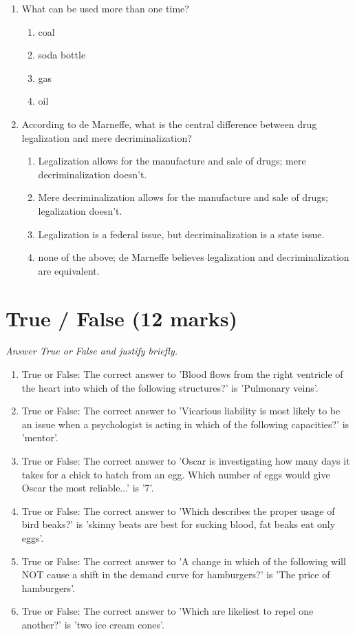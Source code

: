 \documentclass[12pt]{article}
\begin{document}
\begin{enumerate}[label=\arabic*.]
\begin{enumerate}[label=(\alph*)]
    \item painted colors
\end{enumerate}
\item What can be used more than one time?
\begin{enumerate}[label=(\alph*)]
    \item coal
    \item soda bottle
    \item gas
    \item oil
\end{enumerate}
\item According to de Marneffe, what is the central difference between drug legalization and mere decriminalization?
\begin{enumerate}[label=(\alph*)]
    \item Legalization allows for the manufacture and sale of drugs; mere decriminalization doesn't.
    \item Mere decriminalization allows for the manufacture and sale of drugs; legalization doesn't.
    \item Legalization is a federal issue, but decriminalization is a state issue.
    \item none of the above; de Marneffe believes legalization and decriminalization are equivalent.
\end{enumerate}
\end{enumerate}

\section*{True / False (12 marks)}
\textit{Answer True or False and justify briefly.}
\begin{enumerate}[label=\arabic*.]
\item True or False: The correct answer to 'Blood flows from the right ventricle of the heart into which of the following structures?' is 'Pulmonary veins'.
\item True or False: The correct answer to 'Vicarious liability is most likely to be an issue when a psychologist is acting in which of the following capacities?' is 'mentor'.
\item True or False: The correct answer to 'Oscar is investigating how many days it takes for a chick to hatch from an egg. Which number of eggs would give Oscar the most reliable...' is '7'.
\item True or False: The correct answer to 'Which describes the proper usage of bird beaks?' is 'skinny beats are best for sucking blood, fat beaks eat only eggs'.
\item True or False: The correct answer to 'A change in which of the following will NOT cause a shift in the demand curve for hamburgers?' is 'The price of hamburgers'.
\item True or False: The correct answer to 'Which are likeliest to repel one another?' is 'two ice cream cones'.
\end{enumerate}
\end{document}

